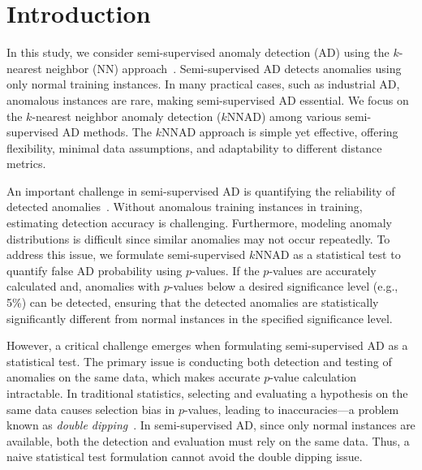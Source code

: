 \section{Introduction}
\label{sec:intro}
%
In this study, we consider semi-supervised anomaly detection (AD) using the $k$-nearest neighbor (NN) approach~\citep{breunig2000lof,ramaswamy2000efficient,mehrotra2017anomaly}.
%
Semi-supervised AD detects anomalies using only normal training instances.
%
In many practical cases, such as industrial AD, anomalous instances are rare, making semi-supervised AD essential.
%
We focus on the $k$-nearest neighbor anomaly detection ($k$NNAD) among various semi-supervised AD methods.
%
The $k$NNAD approach is simple yet effective, offering flexibility, minimal data assumptions, and adaptability to different distance metrics.

An important challenge in semi-supervised AD is quantifying the reliability of detected anomalies~\citep{barnett1994outliers,chandola2009anomaly,montgomery2020introduction}.
%
Without anomalous training instances in training, estimating detection accuracy is challenging.
%
Furthermore, modeling anomaly distributions is difficult since similar anomalies may not occur repeatedly.
%
To address this issue, we formulate semi-supervised $k$NNAD as a statistical test to quantify false AD probability using $p$-values.
%
If the $p$-values are accurately calculated and, anomalies with $p$-values below a desired significance level (e.g., 5\%) can be detected, ensuring that the detected anomalies are statistically significantly different from normal instances in the specified significance level.

However, a critical challenge emerges when formulating semi-supervised AD as a statistical test.
%
The primary issue is conducting both detection and testing of anomalies on the same data, which makes accurate $p$-value calculation intractable. 
%
In traditional statistics, selecting and evaluating a hypothesis on the same data causes selection bias in $p$-values, leading to inaccuracies—a problem known as \emph{double dipping}~\citep{breiman1992little,kriegeskorte2009circular,benjamini2020selective}.
%
In semi-supervised AD, since only normal instances are available, both the detection and evaluation must rely on the same data.
%
Thus, a naive statistical test formulation cannot avoid the double dipping issue.

